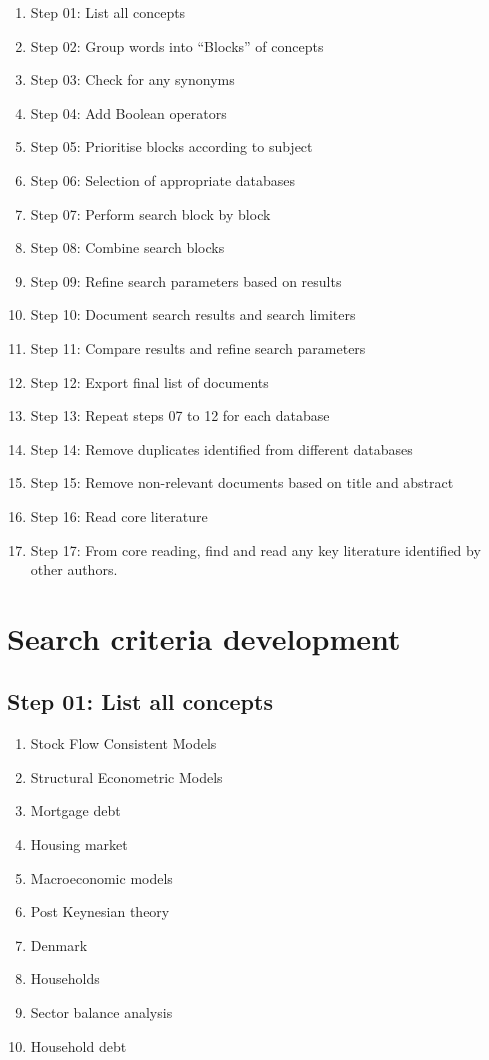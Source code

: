 \documentclass[
]{book}
\providecommand{\tightlist}{%
  \setlength{\itemsep}{0pt}\setlength{\parskip}{0pt}}
\begin{document}
\begin{enumerate}
\def\labelenumi{\arabic{enumi}.}
\tightlist
\item
  Step 01: List all concepts
\item
  Step 02: Group words into ``Blocks'' of concepts
\item
  Step 03: Check for any synonyms
\item
  Step 04: Add Boolean operators
\item
  Step 05: Prioritise blocks according to subject
\item
  Step 06: Selection of appropriate databases
\item
  Step 07: Perform search block by block
\item
  Step 08: Combine search blocks
\item
  Step 09: Refine search parameters based on results
\item
  Step 10: Document search results and search limiters
\item
  Step 11: Compare results and refine search parameters
\item
  Step 12: Export final list of documents
\item
  Step 13: Repeat steps 07 to 12 for each database
\item
  Step 14: Remove duplicates identified from different databases
\item
  Step 15: Remove non-relevant documents based on title and abstract
\item
  Step 16: Read core literature
\item
  Step 17: From core reading, find and read any key literature identified by other authors.
\end{enumerate}

\hypertarget{search-criteria-development}{%
\section{Search criteria development}\label{search-criteria-development}}

\hypertarget{step-01-list-all-concepts}{%
\subsection{Step 01: List all concepts}\label{step-01-list-all-concepts}}

\begin{enumerate}
\def\labelenumi{\arabic{enumi}.}
\tightlist
\item
  Stock Flow Consistent Models
\item
  Structural Econometric Models
\item
  Mortgage debt
\item
  Housing market
\item
  Macroeconomic models
\item
  Post Keynesian theory
\item
  Denmark
\item
  Households
\item
  Sector balance analysis
\item
  Household debt
\end{enumerate}
\end{document}
